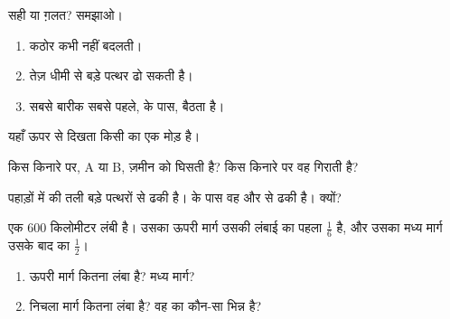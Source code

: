 \begin{exercise}[$\star$]\label{exo:g5:water-shapes-the-land:4}
सही या ग़लत? समझाओ।
\begin{enumerate}
  \item[(क)] कठोर  कभी नहीं बदलती।
  \item[(ख)] तेज़  धीमी  से बड़े पत्थर ढो सकती है।
  \item[(ग)] सबसे बारीक  सबसे पहले,  के पास, बैठता है।
\end{enumerate}
\end{exercise}

\begin{exercise}[$\star$]\label{exo:g5:water-shapes-the-land:5}
यहाँ ऊपर से दिखता किसी  का एक मोड़ है।

\begin{center}
\end{center}
 किस किनारे पर, A या B, ज़मीन को घिसती है? किस किनारे पर वह
 गिराती है?
\end{exercise}

\begin{exercise}[$\star$]\label{exo:g5:water-shapes-the-land:6}
पहाड़ों में  की तली बड़े पत्थरों से ढकी है।  के पास वह  और 
से ढकी है। क्यों?
\end{exercise}

\begin{exercise}[$\star\star$]\label{exo:g5:water-shapes-the-land:7}
एक  600 किलोमीटर लंबी है। उसका ऊपरी मार्ग उसकी लंबाई का पहला
$\frac{1}{6}$ है, और उसका मध्य मार्ग उसके बाद का
$\frac{1}{2}$।
\begin{enumerate}
  \item[(क)] ऊपरी मार्ग कितना लंबा है? मध्य मार्ग?
  \item[(ख)] निचला मार्ग कितना लंबा है? वह  का कौन-सा भिन्न
        है?
\end{enumerate}
\end{exercise}

